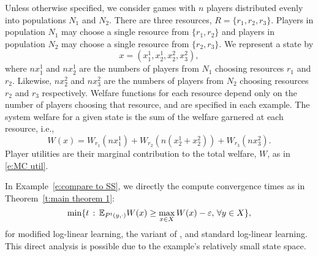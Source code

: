 Unless otherwise specified, we consider games with $n$ players distributed evenly into populations $N_1$ and $N_2$. There are three resources, $R = \{r_1,r_2,r_3\}$. Players in population $N_1$ may choose a single resource from $\{r_1,r_2\}$ and players in population $N_2$ may choose a single resource from $\{r_2,r_3\}.$ We represent a state by 
\begin{equation}x = \left(x_1^1,x_2^1,x_2^2,x_3^2\right),\label{e:states}\end{equation}
where $nx_1^1$ and $nx_2^1$ are the numbers of players from $N_1$ choosing resources $r_1$ and $r_2$.  Likewise, $nx_2^2$ and $nx_3^2$ are the numbers of players from $N_2$ choosing resources $r_2$ and $r_3$ respectively.  Welfare functions for each resource depend only on the number of players choosing that resource, and are specified in each example. The system welfare for a given state is the sum of the welfare garnered at each resource, i.e.,
\begin{equation*}
W(x) = W_{r_1}(nx_1^1) + W_{r_2}(n(x_2^1+x_2^2)) + W_{r_3}(nx_3^2).
\end{equation*}
Player utilities are their marginal contribution to the total welfare, $W$, as in \eqref{e:MC util}.


In Example~\ref{e:compare to SS}, we directly the compute convergence times as in Theorem~\ref{t:main theorem 1}: 
\begin{equation}\label{e:example conv time}
\min\{t\,:\,\mathbb{E}_{P^t(y,\cdot)}W(x)\geq \max_{x\in X} W(x) - \varepsilon,\,\forall y\in X\},
\end{equation}
for modified log-linear learning, the variant of \cite{Shah2010}, and standard log-linear learning. This direct analysis is possible due to the example's relatively small state space.




